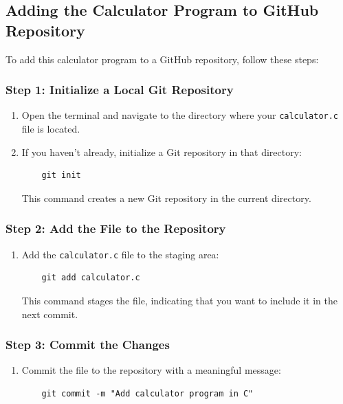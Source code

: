 \documentclass{article}
\begin{document}
\subsection{Adding the Calculator Program to GitHub Repository}
To add this calculator program to a GitHub repository, follow these steps:

\subsubsection{Step 1: Initialize a Local Git Repository}
\begin{enumerate}
    \item Open the terminal and navigate to the directory where your \texttt{calculator.c} file is located.
    \item If you haven't already, initialize a Git repository in that directory:
    \begin{verbatim}
    git init
    \end{verbatim}
    This command creates a new Git repository in the current directory.
\end{enumerate}

\subsubsection{Step 2: Add the File to the Repository}
\begin{enumerate}
    \item Add the \texttt{calculator.c} file to the staging area:
    \begin{verbatim}
    git add calculator.c
    \end{verbatim}
    This command stages the file, indicating that you want to include it in the next commit.
\end{enumerate}

\subsubsection{Step 3: Commit the Changes}
\begin{enumerate}
    \item Commit the file to the repository with a meaningful message:
    \begin{verbatim}
    git commit -m "Add calculator program in C"
    \end{verbatim}
\end{enumerate}
\end{document}
